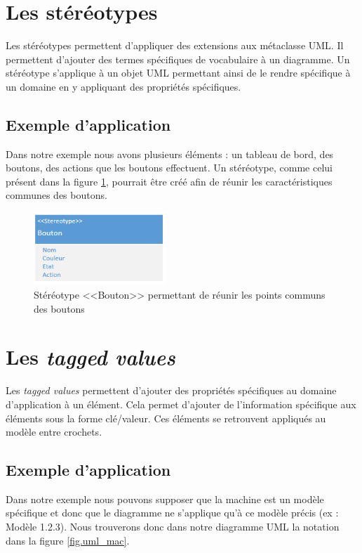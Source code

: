 \newpage
\section{Les stéréotypes}
Les stéréotypes permettent d'appliquer des extensions aux métaclasse UML.
Il permettent d'ajouter des termes spécifiques de vocabulaire à un diagramme.
Un stéréotype s'applique à un objet UML permettant ainsi de le rendre spécifique à un domaine en y appliquant des propriétés spécifiques.

\subsection{Exemple d'application}
Dans notre exemple nous avons plusieurs éléments : un tableau de bord, des boutons, des actions que les boutons effectuent.
Un stéréotype, comme celui présent dans la figure \ref{fig.uml_but}, pourrait être créé afin de réunir les caractéristiques communes des boutons.


\begin{figure}[H]
    \begin{center}
    \includegraphics[width=5cm]{10_img/chap4/button.PNG}
    \caption{Stéréotype <<Bouton>> permettant de réunir les points communs des boutons}
    \label{fig.uml_but}
    \end{center}
\end{figure}


\newpage
\section{Les \emph{tagged values}}
Les \emph{tagged values} permettent d'ajouter des propriétés spécifiques au domaine d'application à un élément.
Cela permet d'ajouter de l'information spécifique aux éléments sous la forme clé/valeur.
Ces éléments se retrouvent appliqués au modèle entre crochets.

\subsection{Exemple d'application}
Dans notre exemple nous pouvons supposer que la machine est un modèle spécifique et donc que le diagramme ne s'applique qu'à ce modèle précis (ex : Modèle 1.2.3).
Nous trouverons donc dans notre diagramme UML la notation dans la figure \ref{fig.uml_mac}.

